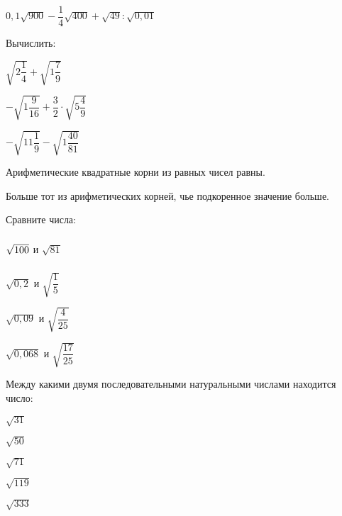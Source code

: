 \begin{class}[number=2]
\begin{listofex}
\begin{enumcols}[itemcolumns=2]
			\item \( 0,1\sqrt{900}-\dfrac{1}{4}\sqrt{400}+\sqrt{49}:\sqrt{0,01} \)
		\end{enumcols}
		\item Вычислить:
		\begin{enumcols}[itemcolumns=3]
			\item \( \sqrt{2\dfrac{1}{4}}+\sqrt{1\dfrac{7}{9}} \)
			\item \( -\sqrt{1\dfrac{9}{16}}+\dfrac{3}{2}\cdot\sqrt{5\dfrac{4}{9}} \)
			\item \( -\sqrt{11\dfrac{1}{9}}-\sqrt{1\dfrac{40}{81}} \)
		\end{enumcols}
	\end{listofex}
	\begin{definit}
		Арифметические квадратные корни из равных чисел равны.
	\end{definit}
	\begin{definit}
		Больше тот из арифметических корней, чье подкоренное значение больше.
	\end{definit}
	\begin{listofex}[resume]
		\item Сравните числа:
		\begin{enumcols}[itemcolumns=4]
			\item \( \vphantom{\sqrt{\dfrac{1}{5}}}\sqrt{100} \) и \( \sqrt{81} \)
			\item \( \sqrt{0,2} \) и \( \sqrt{\dfrac{1}{5}} \)
			\item \( \sqrt{0,09} \) и \( \sqrt{\dfrac{4}{25}} \)
			\item \( \sqrt{0,068} \) и \( \sqrt{\dfrac{17}{25}} \)
		\end{enumcols}
		\item Между какими двумя последовательными натуральными числами находится число:
		\begin{enumcols}[itemcolumns=5]
			\item \( \sqrt{31} \)
			\item \( \sqrt{50} \)
			\item \( \sqrt{71} \)
			\item \( \sqrt{119} \)
			\item \( \sqrt{333} \)

\end{enumcols}
\end{listofex}
\end{class}
